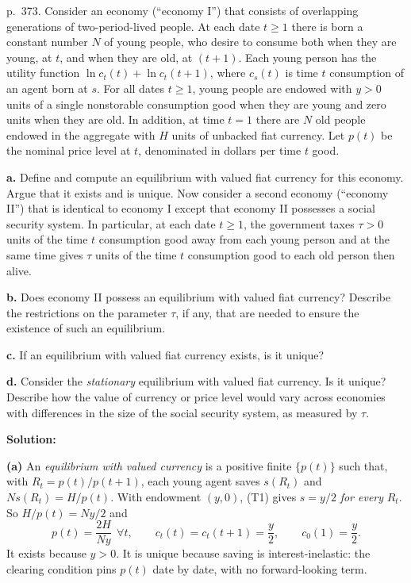 \documentclass[12pt, letterpaper]{article}
\begin{document}
\begin{tcolorbox}[oddbox,title={Exercise 9.9 \quad Social security and the price level}]
\begin{tcolorbox}[questionbox]
p.~373. Consider an economy (``economy I'') that consists of overlapping generations of
two-period-lived people. At each date $t\ge1$ there is born a constant number $N$ of young people,
who desire to consume both when they are young, at $t$, and when they are old, at $(t+1)$. Each young
person has the utility function $\ln c_t(t)+\ln c_t(t+1)$, where $c_s(t)$ is time $t$ consumption of
an agent born at $s$. For all dates $t\ge1$, young people are endowed with $y>0$ units of a single
nonstorable consumption good when they are young and zero units when they are old. In addition, at
time $t=1$ there are $N$ old people endowed in the aggregate with $H$ units of unbacked fiat currency.
Let $p(t)$ be the nominal price level at $t$, denominated in dollars per time $t$ good.

\textbf{a.} Define and compute an equilibrium with valued fiat currency for this economy. Argue that
it exists and is unique. Now consider a second economy (``economy II'') that is identical to economy
I except that economy II possesses a social security system. In particular, at each date $t\ge1$, the
government taxes $\tau>0$ units of the time $t$ consumption good away from each young person and at
the same time gives $\tau$ units of the time $t$ consumption good to each old person then alive.

\textbf{b.} Does economy II possess an equilibrium with valued fiat currency? Describe the
restrictions on the parameter $\tau$, if any, that are needed to ensure the existence of such an
equilibrium.

\textbf{c.} If an equilibrium with valued fiat currency exists, is it unique?

\textbf{d.} Consider the \emph{stationary} equilibrium with valued fiat currency. Is it unique?
Describe how the value of currency or price level would vary across economies with differences in
the size of the social security system, as measured by $\tau$.
\end{tcolorbox}

\textbf{Solution:}

\textbf{(a)} An \emph{equilibrium with valued currency} is a positive finite $\{p(t)\}$ such that,
with $R_t=p(t)/p(t+1)$, each young agent saves $s(R_t)$ and $Ns(R_t)=H/p(t)$. With endowment $(y,0)$,
(T1) gives $s=y/2$ \emph{for every} $R_t$. So $H/p(t)=Ny/2$ and
\[
\boxed{p(t)=\frac{2H}{Ny}\ \ \forall t,\qquad c_t(t)=c_t(t+1)=\frac y2,\qquad c_0(1)=\frac y2.}
\]
It exists because $y>0$. It is unique because saving is interest-inelastic: the clearing condition
pins $p(t)$ date by date, with no forward-looking term.


\end{tcolorbox}
\end{document}
